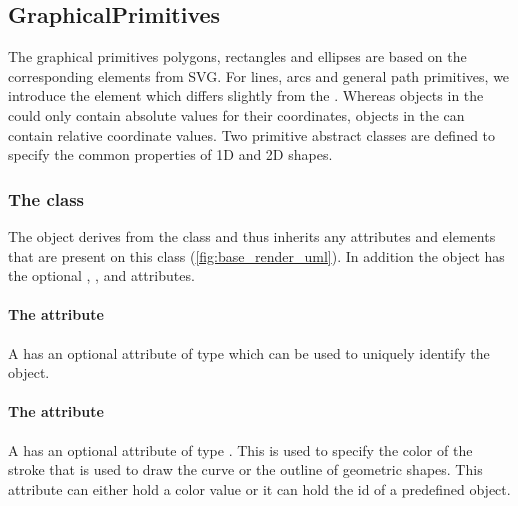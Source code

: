 \subsection{GraphicalPrimitives}

The graphical primitives polygons, rectangles and ellipses are based on the 
corresponding elements from SVG. For lines, arcs and general path primitives, we 
introduce the \RenderCurve element which differs slightly from the \LayoutPackage {}. 
Whereas  objects in the \LayoutPackage could only contain 
absolute values for their coordinates, \RenderPoint objects in the \RenderPackage 
can contain relative coordinate values.  Two primitive abstract classes are defined to specify the common properties of 1D and 2D shapes.


\subsubsection{The  class}
\label{graphicalprimitiveoned-class}

The \GraphicalPrimitiveOneD object derives from the \TransformationTwoD
class and thus inherits any attributes and elements that are present on
this class (\ref{fig:base_render_uml}).
In addition the \GraphicalPrimitiveOneD object has the optional , ,  and  attributes.

\paragraph{The \fixttspace{} attribute}

A \GraphicalPrimitiveOneD has an optional attribute  of type
 which can be used to uniquely identify the object.

\paragraph{The \fixttspace{} attribute}

A \GraphicalPrimitiveOneD has an optional attribute  of
type . This is used to specify the color of the stroke that is used to draw the curve 
or the outline of geometric shapes. This 
attribute can either hold a color value or it can hold the id of a predefined
\ColorDefinition object.

